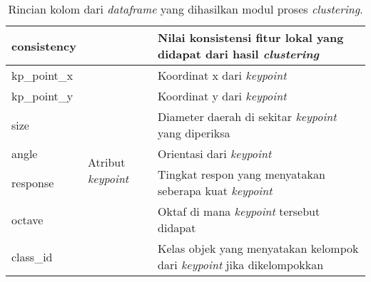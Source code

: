 \begin{table}[H]
\begin{tabular}{|p{}|p{}|p{}|}
		consistency     &                                           & Nilai konsistensi fitur lokal yang didapat dari hasil \textit{clustering}                                            \\ \hline
		kp\_point\_x    & \multirow{7}{*}{Atribut \textit{keypoint}}         & Koordinat x dari \textit{keypoint}                                                                                   \\ \cline{1-1} \cline{3-3} 
		kp\_point\_y    &                                           & Koordinat y dari \textit{keypoint}                                                                                   \\ \cline{1-1} \cline{3-3} 
		size            &                                           & Diameter daerah di sekitar \textit{keypoint} yang diperiksa                                                          \\ \cline{1-1} \cline{3-3} 
		angle           &                                           & Orientasi dari \textit{keypoint}                                                                                     \\ \cline{1-1} \cline{3-3} 
		response        &                                           & Tingkat respon yang menyatakan seberapa kuat \textit{keypoint}                                                       \\ \cline{1-1} \cline{3-3} 
		octave          &                                           & Oktaf di mana \textit{keypoint} tersebut didapat                                                                     \\ \cline{1-1} \cline{3-3} 
		class\_id       &                                           & Kelas objek yang menyatakan kelompok dari \textit{keypoint} jika dikelompokkan                                       \\ \hline
	\end{tabular}
	\caption{Rincian kolom dari \textit{dataframe} yang dihasilkan modul proses \textit{clustering}.}
	\label{tab:df_clustering}
\end{table}
 
